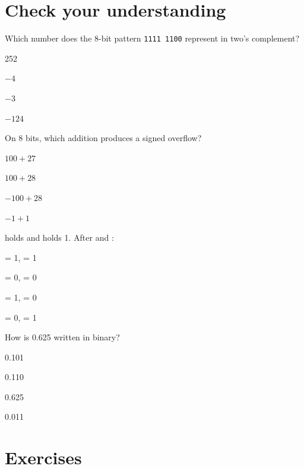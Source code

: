 



\section{Check your understanding}

\begin{quiz}{Which number does the 8-bit pattern \texttt{1111 1100} represent in two's complement?}
\item 252
\item $-4$
\item $-3$
\item $-124$
\end{quiz}

\begin{quiz}{On 8 bits, which addition produces a signed overflow?}
\item $100 + 27$
\item $100 + 28$
\item $-100 + 28$
\item $-1 + 1$
\end{quiz}

\begin{quiz}{ holds  and  holds 1. After
 and :}
\item {} = 1,  = 1
\item {} = 0,  = 0
\item {} = 1,  = 0
\item {} = 0,  = 1
\end{quiz}

\begin{quiz}{How is 0.625 written in binary?}
\item 0.101
\item 0.110
\item 0.625
\item 0.011
\end{quiz}

\section{Exercises}

